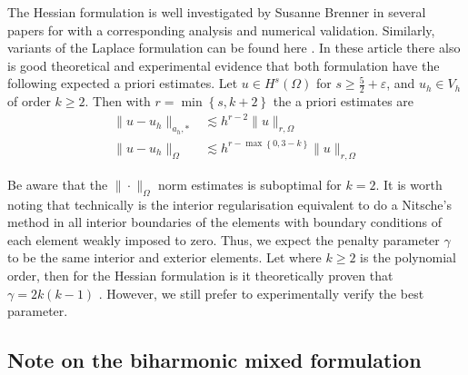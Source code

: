 \documentclass[11pt]{article}
\theoremstyle{remark}
\renewcommand{\ge}{\geqslant}
\numberwithin{equation}{section}
\begin{document}
The Hessian formulation is well investigated by Susanne Brenner in several papers for \cite{brenner2012, brenner2012quadratic, brenner2012quadratic_kirk} with a corresponding analysis and numerical validation. Similarly, variants of the Laplace formulation can be found here
\cite{feng2007fully, georgoulis2009discontinuous}. In these article there also is good theoretical and experimental evidence that both formulation have the following expected a priori estimates. Let  $u \in H^{s}( \Omega ) $ for $s\ge  \frac{5}{2} + \varepsilon$, and $u_{h}\in
V_{h}  $ of order $k\ge 2$. Then with $r = \min\left\{ s,
k+2 \right\}$ the a priori estimates are   \[
    \begin{split}
\| u - u_{h} \|_{ a_{h},*  }^{  }  & \lesssim  h^{r-2} \| u \|_{ r, \Omega  }^{  } \\
\| u - u_{h} \|_{ \Omega   }^{  }  & \lesssim  h^{r- \max_{}\left\{ 0, 3-k \right\}  } \| u \|_{ r,\Omega  }^{  }
    \end{split}
\]

Be aware that the $\| \cdot  \|_{\Omega   }^{  } $ norm estimates is suboptimal for $k=2$.
It is worth noting that technically is the interior regularisation equivalent to do a Nitsche's method in all interior boundaries of the elements with boundary conditions of each element weakly
imposed to zero. Thus, we expect the penalty parameter $\gamma$ to be the same interior and exterior elements. Let where $k\ge 2$ is the polynomial order, then for the Hessian formulation is it theoretically proven that $\gamma = 2k ( k-1 ) $
\cite{brenner2012quadratic, brenner2012}. However, we still prefer to experimentally verify the best parameter.


\subsection{Note on the biharmonic mixed formulation}%
\label{subsec:biharmonic_mixed_formulation}
\end{document}
